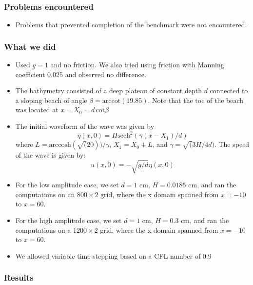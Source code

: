 \subsubsection{Problems encountered}

\begin{itemize}
\item Problems that prevented completion of the benchmark were not encountered.
\end {itemize}

\subsubsection{What we did}

\begin{itemize}
\item Used $g=1$ and no friction.  We also tried using friction with Manning
coefficient 0.025 and observed no difference.
\item The bathymetry consisted of a deep plateau of constant depth $d$
connected to a sloping beach of angle $\beta = \text{arccot}(19.85)$.
Note that the toe of the beach was located at $x = X_0 = d\, \text{cot} \beta$
\item The initial waveform of the wave was given by 
\begin{equation}
\eta(x,0) = H \text{sech}^2(\gamma (x - X_1)/d)
\end{equation}
where $L = \text{arccosh}(\sqrt(20))/\gamma$, $X_1 = X_0 + L$, 
and $\gamma = \sqrt(3H/4d)$. The speed of the wave is given by: 
\begin{equation}
u(x,0)=-\sqrt{g/d}\eta(x,0)
\end{equation}
\item For the low amplitude case, we set $d = 1$ cm, $H = 0.0185$ cm, and
ran the computations on an $800\times 2$ grid, where the x domain
spanned from $x = -10$ to $x = 60$.
\item For the high amplitude case, we set $d = 1$ cm, $H = 0.3$ cm,
and ran the computations on a $1200\times 2$ grid, where the x domain
spanned from $x = -10$ to $x = 60$.
\item We allowed variable time stepping based on a CFL number of 0.9
\end{itemize} 

\subsubsection{Results}

